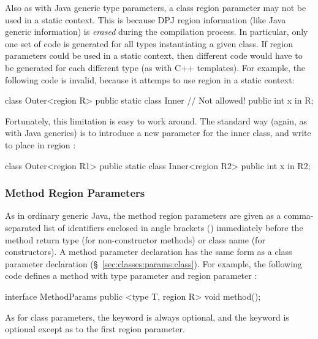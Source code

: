 Also as with Java generic type parameters, a class region parameter
may not be used in a static context.  This is because DPJ region
information (like Java generic information) is \emph{erased} during
the compilation process.  In particular, only one set of code is
generated for all types instantiating a given class.  If region
parameters could be used in a static context, then different code
would have to be generated for each different type (as with C++
templates).
%
For example, the following code is invalid, because it attemps to use
region  in a static context:
%
\begin{dpjlisting}
class Outer<region R> {
    public static class Inner {
        // Not allowed!
        public int x in R;
    }
}
\end{dpjlisting}

Fortunately, this limitation is easy to work around.  The standard way
(again, as with Java generics) is to introduce a new parameter for the
inner class, and write  to place  in region
:

\begin{dpjlisting}
class Outer<region R1> {
    public static class Inner<region R2> {
        public int x in R2;
    }
}
\end{dpjlisting}


\subsubsection{Method Region Parameters%
\label{sec:classes:params:method}}

 As in ordinary generic
Java, the method region parameters are given as a comma-separated list
of identifiers enclosed in angle brackets (\kwd{<>}) immediately
before the method return type (for non-constructor methods) or class
name (for constructors).  A method parameter declaration has the same
form as a class parameter declaration
(\S~\ref{sec:classes:params:class}).
%
For example, the following code defines a method with type parameter
 and region parameter :
%
\begin{dpjlisting}
interface MethodParams {
    public <type T, region R> void method();
}
\end{dpjlisting}
%
As for class parameters, the  keyword is always optional,
and the  keyword is optional except as to the first region
parameter.

